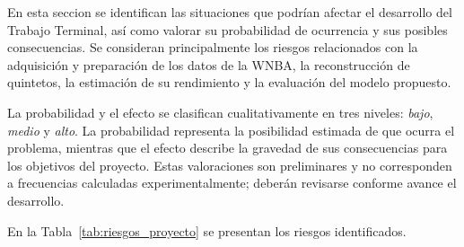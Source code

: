 En esta seccion se identifican las situaciones que podrían afectar el desarrollo del Trabajo Terminal, así como valorar su probabilidad de ocurrencia y sus posibles consecuencias. Se consideran principalmente los riesgos relacionados con la adquisición y preparación de los datos de la WNBA, la reconstrucción de quintetos, la estimación de su rendimiento y la evaluación del modelo propuesto.

La probabilidad y el efecto se clasifican cualitativamente en tres niveles: \emph{bajo}, \emph{medio} y \emph{alto}. La probabilidad representa la posibilidad estimada de que ocurra el problema, mientras que el efecto describe la gravedad de sus consecuencias para los objetivos del proyecto. Estas valoraciones son preliminares y no corresponden a frecuencias calculadas experimentalmente; deberán revisarse conforme avance el desarrollo.

En la Tabla~\ref{tab:riesgos_proyecto} se presentan los riesgos identificados.

